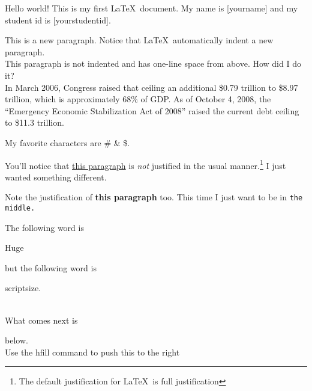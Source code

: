 \documentclass[10pt]{article}
\begin{document}
Hello world! This is my first \LaTeX\, document. My name is [yourname] and
my student id is [yourstudentid].


This is a new paragraph. Notice that \LaTeX\, automatically indent a new
paragraph.\\


\noindent This paragraph is not indented and has one-line space from above. How did I
do it?\\


In March 2006, Congress raised that ceiling an additional \$0.79 trillion to
\$8.97 trillion, which is approximately 68\% of GDP. As of October 4, 2008, the
\enquote{Emergency Economic Stabilization Act of 2008} raised the current debt ceiling
to \$11.3 trillion.


My favorite characters are \# \& \$.


\begin{flushright} 
You'll notice that \ul{this paragraph} is \textit{not} justified in the usual manner.\footnote{The default justification for \LaTeX\, is full justification} 
I just wanted something different.
\end{flushright}

\begin{center}
Note the justification of \textbf{this paragraph} too. This time I just want to be in
\texttt{the middle.}
\end{center}

The following word is 
\begin{huge}Huge\end{huge} 
but the following word is 
\begin{scriptsize}scriptsize.\end{scriptsize}\\
What comes next is

\vspace{2cm}

\noindent 2cm below.\\
\indent Use the hfill command to push \hfill this to the right
\indent{}
\end{document}
